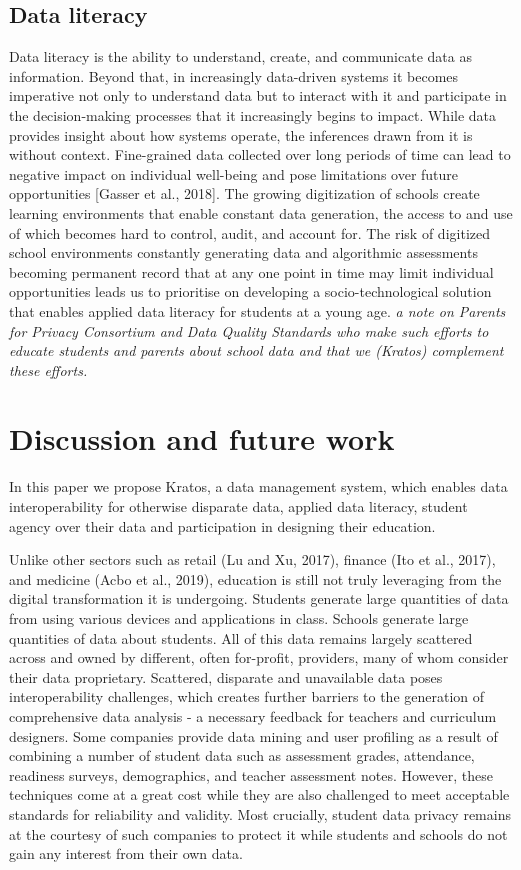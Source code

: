 \documentclass{article}
\begin{document}
\subsection{Data literacy}
Data literacy is the ability to understand, create, and communicate data as information. Beyond that, in increasingly data-driven systems it becomes imperative not only to understand data but to interact with it and participate in the decision-making processes that it increasingly begins to impact. While data provides insight about how systems operate, the inferences drawn from it is without context. Fine-grained data collected over long periods of time can lead to negative impact on individual well-being and pose limitations over future opportunities [Gasser et al., 2018]. The growing digitization of schools create learning environments that enable constant data generation, the access to and use of which becomes hard to control, audit, and account for. The risk of digitized school environments constantly generating data and algorithmic assessments becoming permanent record that at any one point in time may limit individual opportunities leads us to prioritise on developing a socio-technological solution that enables applied data literacy for students at a young age. \textit{a note on Parents for Privacy Consortium and Data Quality Standards who make such efforts to educate students and parents about school data and that we (Kratos) complement these efforts.}

\section{Discussion and future work}
In this paper we propose Kratos, a data management system, which enables data interoperability for otherwise disparate data, applied data literacy, student agency over their data and participation in designing their education.

Unlike other sectors such as retail (Lu and Xu, 2017), finance (Ito et al., 2017), and medicine (Acbo et al., 2019), education is still not truly leveraging from the digital transformation it is undergoing. Students generate large quantities of data from using various devices and applications in class. Schools generate large quantities of data about students. All of this data remains largely scattered across and owned by different, often for-profit, providers, many of whom consider their data proprietary. Scattered, disparate and unavailable data poses interoperability challenges, which creates further barriers to the generation of comprehensive data analysis - a necessary feedback for teachers and curriculum designers. Some companies provide data mining and user profiling as a result of combining a number of student data such as assessment grades, attendance, readiness surveys, demographics, and teacher assessment notes. However, these techniques come at a great cost while they are also challenged to meet acceptable standards for reliability and validity. Most crucially, student data privacy remains at the courtesy of such companies to protect it while students and schools do not gain any interest from their own data.
\end{document}
